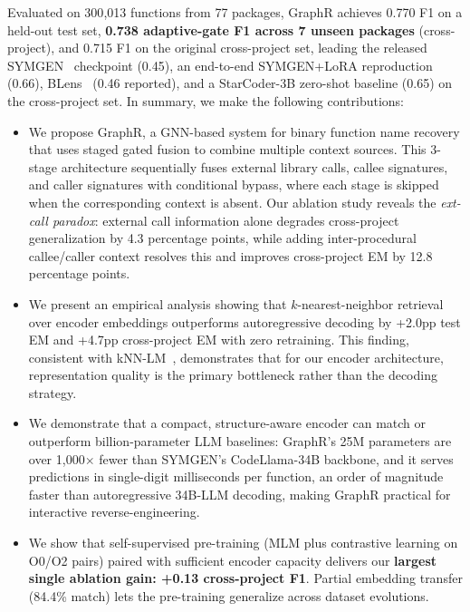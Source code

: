 \documentclass[sigconf,nonacm]{acmart}
\newcommand{\sysname}{\textsf{GraphR}}
\begin{document}
Evaluated on 300{,}013 functions from 77 packages, \sysname{} achieves 0.770 F1 on a held-out test set, \textbf{0.738 adaptive-gate F1 across 7 unseen packages} (cross-project), and 0.715 F1 on the original cross-project set, leading the released SYMGEN~\cite{symgen} checkpoint (0.45), an end-to-end SYMGEN+LoRA reproduction (0.66), BLens~\cite{blens} (0.46 reported), and a StarCoder-3B zero-shot baseline (0.65) on the cross-project set. In summary, we make the following contributions:

\begin{itemize}
    \item We propose \sysname{}, a GNN-based system for binary function name recovery that uses staged gated fusion to combine multiple context sources. This 3-stage architecture sequentially fuses external library calls, callee signatures, and caller signatures with conditional bypass, where each stage is skipped when the corresponding context is absent. Our ablation study reveals the \emph{ext-call paradox}: external call information alone degrades cross-project generalization by 4.3 percentage points, while adding inter-procedural callee/caller context resolves this and improves cross-project EM by 12.8 percentage points.

    \item We present an empirical analysis showing that $k$-nearest-neighbor retrieval over encoder embeddings outperforms autoregressive decoding by +2.0pp test EM and +4.7pp cross-project EM with zero retraining. This finding, consistent with kNN-LM~\cite{knnlm}, demonstrates that for our encoder architecture, representation quality is the primary bottleneck rather than the decoding strategy.

    \item We demonstrate that a compact, structure-aware encoder can match or outperform billion-parameter LLM baselines: \sysname{}'s 25M parameters are over 1{,}000$\times$ fewer than SYMGEN's CodeLlama-34B backbone, and it serves predictions in single-digit milliseconds per function, an order of magnitude faster than autoregressive 34B-LLM decoding, making \sysname{} practical for interactive reverse-engineering.

    \item We show that self-supervised pre-training (MLM plus contrastive learning on O0/O2 pairs) paired with sufficient encoder capacity delivers our \textbf{largest single ablation gain: +0.13 cross-project F1}. Partial embedding transfer (84.4\% match) lets the pre-training generalize across dataset evolutions.


\end{itemize}
\end{document}

